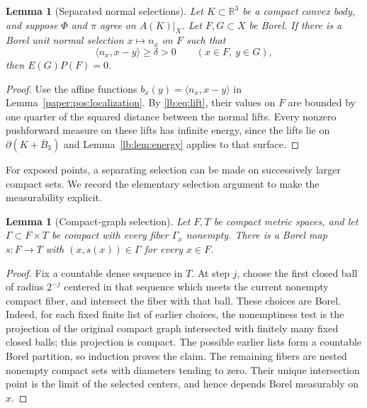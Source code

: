 \documentclass[11pt,letterpaper]{amsart}
\newtheorem{lemma}[theorem]{Lemma}
\theoremstyle{definition}
\theoremstyle{remark}
\numberwithin{equation}{section}
\begin{document}
\begin{lemma}[Separated normal selections]\label{lb:lem:sep}
Let $K\subset\mathbb R^3$ be a compact convex body, and suppose
$\Phi$ and $\pi$ agree on $A(K)|_X$. Let $F,G\subset X$ be
Borel. If there is a Borel unit normal selection
$x\mapsto n_x$ on $F$ such that
\[
             \langle n_x,x-y\rangle\ge\delta>0
             \qquad(x\in F,\ y\in G),
\]
then $E(G)P(F)=0$.
\end{lemma}
\begin{proof}
Use the affine functions
$b_x(y)=\langle n_x,x-y\rangle$ in
Lemma~\ref{paper:pos:localization}. By \eqref{lb:eq:lift},
their values on $F$ are bounded by one quarter of the squared
distance between the normal lifts. Every nonzero pushforward
measure on these lifts has infinite energy, since the lifts
lie on $\partial(K+\overline B_3)$ and
Lemma~\ref{lb:lem:energy} applies to that surface.
\end{proof}

For exposed points, a separating selection can be made on
successively larger compact sets. We record the elementary
selection argument to make the measurability explicit.

\begin{lemma}[Compact-graph selection]\label{lb:lem:selection}
Let $F,T$ be compact metric spaces, and let
$\Gamma\subset F\times T$ be compact with every fiber
$\Gamma_x$ nonempty. There is a Borel map $s:F\to T$ with
$(x,s(x))\in\Gamma$ for every $x\in F$.
\end{lemma}
\begin{proof}
Fix a countable dense sequence in $T$. At step $j$, choose
the first closed ball of radius $2^{-j}$ centered in that
sequence which meets the current nonempty compact fiber, and
intersect the fiber with that ball. These choices are Borel.
Indeed, for each fixed finite list of earlier choices, the
nonemptiness test is the projection of the original compact
graph intersected with finitely many fixed closed balls;
this projection is compact. The possible earlier lists form
a countable Borel partition, so induction proves the claim.
The remaining fibers are nested nonempty compact sets with
diameters tending to zero. Their unique intersection point
is the limit of the selected centers, and hence depends
Borel measurably on $x$.
\end{proof}
\end{document}
